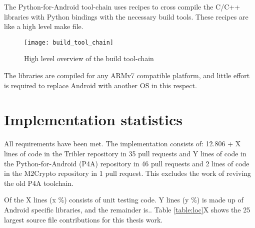 The Python-for-Android tool-chain uses recipes to cross compile the C/C++ libraries with Python bindings with the necessary build tools.
These recipes are like a high level make file.

\begin{figure}[H]
	\centering
	\texttt{[image: build\_tool\_chain]}
	\caption{High level overview of the build tool-chain}
	\label{fig:build_tool_chain}
\end{figure}

The libraries are compiled for any ARMv7 compatible platform, and little effort is required to replace Android with another OS in this respect.



\section{Implementation statistics}\label{sec:impl_stats}
All requirements have been met.
The implementation consists of:
12.806 + X lines of code in the Tribler repository in 35 pull requests and
Y lines of code in the Python-for-Android (P4A) repository in 46 pull requests and
2 lines of code in the M2Crypto repository in 1 pull request.
This excludes the work of reviving the old P4A toolchain.

Of the X lines (x \%) consists of unit testing code.
Y lines (y \%) is made up of Android specific libraries, and the remainder is..
Table \ref{table:loc}X shows the 25 largest source file contributions for this thesis work. 

